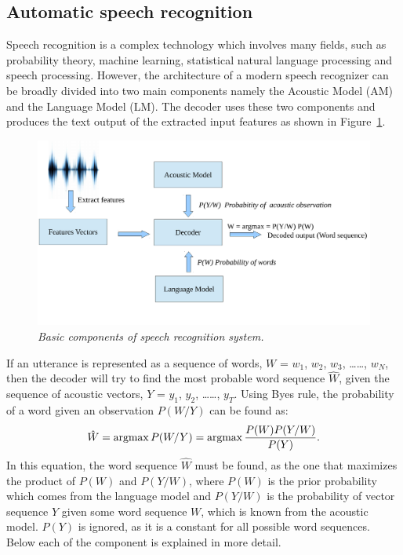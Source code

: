 \documentclass[a4paper, 12pt]{article}
\newcommand{\argmax}{\operatornamewithlimits{argmax}}
\begin{document}
\subsection{Automatic speech recognition}
Speech recognition is a complex technology which involves many fields, such as probability theory, machine learning, statistical natural language processing and speech processing. However, the architecture of a modern speech recognizer can be broadly divided into two main components namely the Acoustic Model (AM) and the Language Model (LM). The decoder uses these two components and produces the text output of the extracted input features as shown in Figure~\ref{fig:asr_component1}. 
\begin{figure}[ht]
\centering
\includegraphics[width=\textwidth]{ASR_Component1.pdf}
\vspace{-1.2cm}
\caption{\textit{Basic components of speech recognition system.}}
\label{fig:asr_component1}
\end{figure}


If an utterance is represented as a sequence of words, $W$ = $w_1$, $w_2$, $w_3$, \dots \dots, $w_N$, then the decoder will try to find the most probable word sequence $\hat{W}$, given the sequence of acoustic vectors, $Y$ = $y_1$, $y_2$, \dots \dots, $y_T$. Using Byes rule, the probability of a word given an observation $P(W/Y)$ can be found as: 
\begin{equation}
\label{equ:bayes_rule}
\hat{W} = \argmax P(W/Y) = \argmax\frac{P(W)P(Y/W)}{P(Y)}.
\end{equation}
In this equation, the word sequence $\hat{W}$ must be found, as the one that maximizes the product of $P(W)$ and $P(Y/W)$, where $P(W)$ is the prior probability which comes from the language model and $P(Y/W)$ is the probability of vector sequence $Y$ given some word sequence $W$, which is known from the acoustic model. $P(Y)$ is ignored, as it is a constant for all possible word sequences. Below each of the component is explained in more detail.
\end{document}
